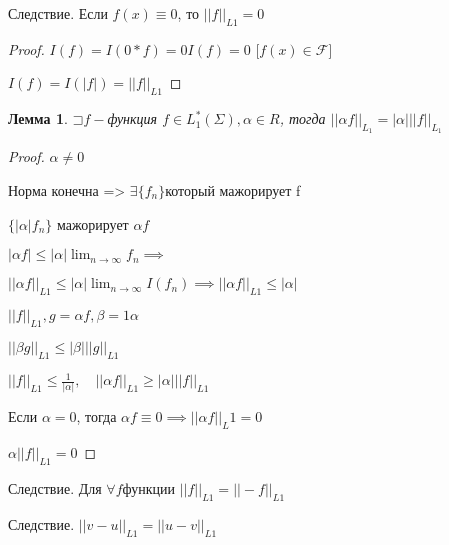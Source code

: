 \documentclass[a4paper, 12pt]{article}
\newcommand\letsymbol{\mathord{\sqsupset}}
\newtheorem{lemma}{Лемма}[section]
\theoremstyle{definition}
\theoremstyle{remark}
\begin{document}
Следствие. Если $f(x)\equiv 0$, то $||f||_{L1} = 0$
\begin{proof}
     $I(f) = I(0*f) = 0I(f) = 0$ [$f(x)\in\mathcal{F} $]
     
     $I(f) = I(|f|) = ||f||_{L1}$
\end{proof}
\begin{lemma}
     $\letsymbol f-$функция $f\in L_1^*(\Sigma), \alpha\in R$, тогда $||\alpha f||_{L_1} = |\alpha|||f||_{L_1}$

\end{lemma}
\begin{proof}
     $\alpha \neq 0$

     Норма конечна => $\exists \{f_n\}$который мажорирует f 
     
     $\{|\alpha|f_n\}$ мажорирует $\alpha f$

     $|\alpha f|\leq |\alpha|\lim_{n\to\infty} f_n\implies$

     $||\alpha f||_{L1}\leq |\alpha|\lim_{n\to\infty} I(f_n)\implies ||\alpha f||_{L1}\leq |\alpha|$

     $||f||_{L1}, g = \alpha f, \beta = 1\alpha$

     $||\beta g||_{L1}\leq |\beta|||g||_{L1}$

     $||f||_{L1}\leq \frac{1}{|\alpha|}, \quad ||\alpha f||_{L1} \geq |\alpha|||f||_{L1}$

     Если $\alpha = 0$, тогда $\alpha f\equiv 0\implies ||\alpha f||_L1 = 0$

     $\alpha ||f||_{L1} = 0$
\end{proof}
Следствие. Для $\forall f$функции $||f||_{L1} = ||-f||_{L1}$

Следствие. $||v - u||_{L1} = ||u - v||_{L1}$
\end{document}

